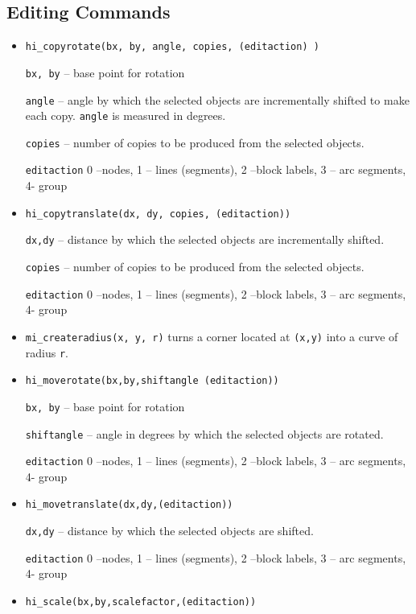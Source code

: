 \subsection{Editing Commands}
\begin{itemize}

\item \texttt{hi\_copyrotate(bx, by, angle, copies, (editaction) )}

\texttt{bx, by} -- base point for rotation

\texttt{angle} -- angle by which the selected objects are incrementally
shifted to make each copy. \texttt{angle} is measured in degrees.

\texttt{copies} -- number of copies to be produced from the selected
objects.

\texttt{editaction} 0 --nodes, 1 -- lines (segments), 2 --block labels, 3 --
arc segments, 4- group

\item \texttt{hi\_copytranslate(dx, dy, copies, (editaction))}

\texttt{dx,dy} -- distance by which the selected objects are incrementally
shifted.

\texttt{copies} -- number of copies to be produced from the selected
objects.

\texttt{editaction} 0 --nodes, 1 -- lines (segments), 2 --block labels, 3 --
arc segments, 4- group

\item{\tt mi\_createradius(x, y, r)} turns a corner located at {\tt (x,y)} into a curve of radius {\tt r}.

\item \texttt{hi\_moverotate(bx,by,shiftangle (editaction))}

\texttt{bx, by} -- base point for rotation

\texttt{shiftangle} -- angle in degrees by which the selected objects are
rotated.

\texttt{editaction} 0 --nodes, 1 -- lines (segments), 2 --block labels, 3 --
arc segments, 4- group

\item \texttt{hi\_movetranslate(dx,dy,(editaction))}

\texttt{dx,dy} -- distance by which the selected objects are shifted.

\texttt{editaction} 0 --nodes, 1 -- lines (segments), 2 --block labels, 3 --
arc segments, 4- group

\item \texttt{hi\_scale(bx,by,scalefactor,(editaction))}


\end{itemize}
